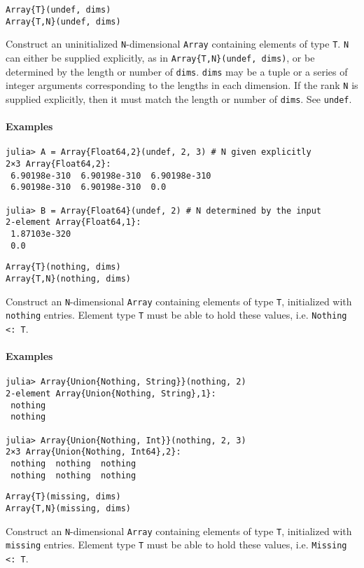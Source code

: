 \begin{verbatim}
Array{T}(undef, dims)
Array{T,N}(undef, dims)
\end{verbatim}
Construct an uninitialized \texttt{N}-dimensional \texttt{Array} containing elements of type \texttt{T}. \texttt{N} can either be supplied explicitly, as in \texttt{Array\{T,N\}(undef, dims)}, or be determined by the length or number of \texttt{dims}. \texttt{dims} may be a tuple or a series of integer arguments corresponding to the lengths in each dimension. If the rank \texttt{N} is supplied explicitly, then it must match the length or number of \texttt{dims}. See \texttt{undef}.

\paragraph*{Examples}
\begin{verbatim}
julia> A = Array{Float64,2}(undef, 2, 3) # N given explicitly
2×3 Array{Float64,2}:
 6.90198e-310  6.90198e-310  6.90198e-310
 6.90198e-310  6.90198e-310  0.0

julia> B = Array{Float64}(undef, 2) # N determined by the input
2-element Array{Float64,1}:
 1.87103e-320
 0.0
\end{verbatim}
\begin{verbatim}
Array{T}(nothing, dims)
Array{T,N}(nothing, dims)
\end{verbatim}
Construct an \texttt{N}-dimensional \texttt{Array} containing elements of type \texttt{T}, initialized with \texttt{nothing} entries. Element type \texttt{T} must be able to hold these values, i.e. \texttt{Nothing <: T}.

\paragraph*{Examples}
\begin{verbatim}
julia> Array{Union{Nothing, String}}(nothing, 2)
2-element Array{Union{Nothing, String},1}:
 nothing
 nothing

julia> Array{Union{Nothing, Int}}(nothing, 2, 3)
2×3 Array{Union{Nothing, Int64},2}:
 nothing  nothing  nothing
 nothing  nothing  nothing
\end{verbatim}
\begin{verbatim}
Array{T}(missing, dims)
Array{T,N}(missing, dims)
\end{verbatim}
Construct an \texttt{N}-dimensional \texttt{Array} containing elements of type \texttt{T}, initialized with \texttt{missing} entries. Element type \texttt{T} must be able to hold these values, i.e. \texttt{Missing <: T}.

